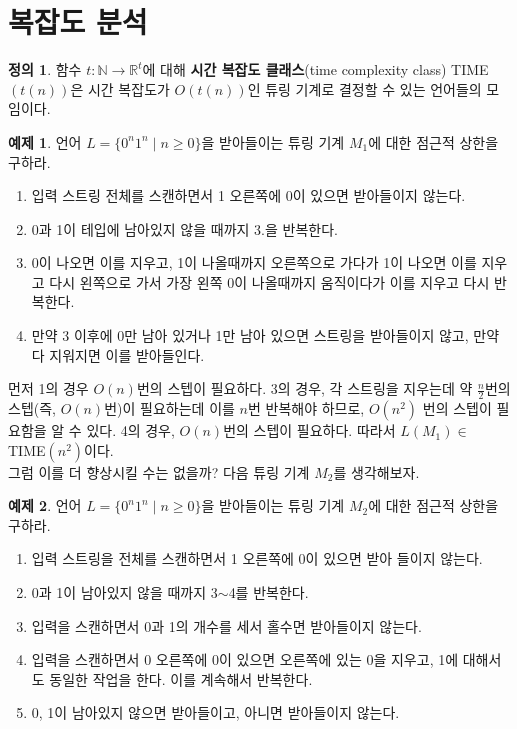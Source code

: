 \documentclass[b5paper]{book}
\theoremstyle{definition}
\newtheorem{defn}{정의}[chapter]
\newtheorem{ex}{예제}[chapter]
\begin{document}
\section{복잡도 분석}
\begin{defn}
    함수 $t: \mathbb{N} \rightarrow \mathbb{R}^{t}$에 대해 \textbf{시간 복잡도 클래스}(time
    complexity class) TIME$(t(n))$은 시간 복잡도가 $O(t(n))$인 튜링 기계로 결정할 수 있는 언어들의 
    모임이다. 
\end{defn}
\begin{ex}
    언어 $L = \{0^n1^n \;\vert\; n \ge 0\}$을 받아들이는 튜링 기계 $M_1$에 대한 점근적 상한을 구하라.
    \begin{enumerate}
        \item 입력 스트링 전체를 스캔하면서 1 오른쪽에 0이 있으면 받아들이지 않는다. 
        \item 0과 1이 테입에 남아있지 않을 때까지 3.을 반복한다. 
        \item 0이 나오면 이를 지우고, 1이 나올때까지 오른쪽으로 가다가 1이 
        나오면 이를 지우고 다시 왼쪽으로 가서
        가장 왼쪽 0이 나올때까지 움직이다가 이를 지우고 다시 반복한다. 
        \item 만약 3 이후에 0만 남아 있거나 1만 남아 있으면 스트링을 받아들이지 
        않고, 만약 다 지워지면 이를 받아들인다. 
    \end{enumerate} 
\end{ex}
먼저 1의 경우 $O(n)$번의 스텝이 필요하다. 3의 경우, 각 스트링을 지우는데 약 $\frac{n}{2}$번의 
스텝(즉, $O(n)$번)이 필요하는데 이를 $n$번 반복해야 하므로, $O(n^2)$ 번의 스텝이 필요함을 알 수 있다. 
4의 경우, $O(n)$번의 스텝이 필요하다. 따라서 $L(M_1) \in$ TIME$(n^2)$이다. \\ 
그럼 이를 더 향상시킬 수는 없을까? 다음 튜링 기계 $M_2$를 생각해보자. 
\begin{ex}
    언어 $L = \{0^n1^n \;\vert\; n \ge 0\}$을 받아들이는 튜링 기계 $M_2$에 대한 점근적 상한을 구하라. 
    \begin{enumerate}
        \item 입력 스트링을 전체를 스캔하면서 1 오른쪽에 0이 있으면 받아 들이지 않는다. 
        \item 0과 1이 남아있지 않을 때까지 3$\sim$4를 반복한다.
        \item 입력을 스캔하면서 0과 1의 개수를 세서 홀수면 받아들이지 않는다.
        \item 입력을 스캔하면서 0 오른쪽에 0이 있으면 오른쪽에 있는 0을 지우고, 1에 대해서도 동일한
        작업을 한다. 이를 계속해서 반복한다.
        \item 0, 1이 남아있지 않으면 받아들이고, 아니면 받아들이지 않는다.
    \end{enumerate}
\end{ex}
\end{document}

